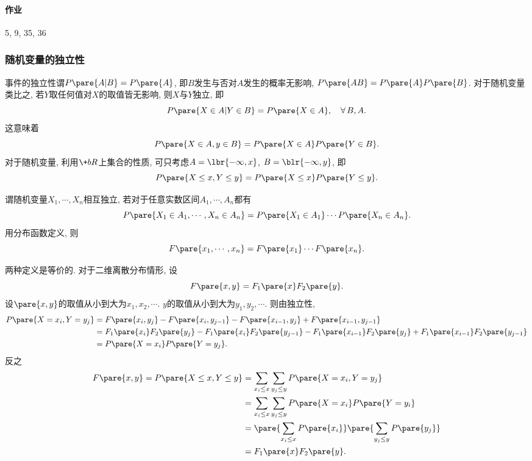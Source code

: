 \documentclass{ctexart}
\begin{document}

\paragraph{作业} %
\label{par:作业}

5, 9, 35, 36



\subsubsection{随机变量的独立性} %
\label{ssub:随机变量的独立性}

事件的独立性谓$P\pare{A\vert B} = P\pare{A}$, 即$B$发生与否对$A$发生的概率无影响, $P\pare{AB} = P\pare{A}P\pare{B}$. 对于随机变量类比之, 若$Y$取任何值对$X$的取值皆无影响, 则$X$与$Y$独立, 即
\[ P\pare{X\in A\vert Y\in B} = P\pare{X\in A},\quad \forall\, B,A. \]
这意味着
\[ P\pare{X\in A,y\in B} = P\pare{X\in A}P\pare{Y\in B}. \]
对于随机变量, 利用$\+bR$上集合的性质, 可只考虑$A = \lbr{-\infty,x}$, $B = \blr{-\infty,y}$, 即
\[ P\pare{X\le x, Y\le y} = P\pare{X\le x}P\pare{Y\le y}. \]
\begin{definition}[随机变量相互独立]
    谓随机变量$X_1,\cdots, X_n$相互独立, 若对于任意实数区间$A_1,\cdots, A_n$都有
    \[ P\pare{X_1 \in A_1,\cdots, X_n \in A_n} = P\pare{X_1\in A_1} \cdots P\pare{X_n \in A_n}. \]
    用分布函数定义, 则
    \[ F\pare{x_1,\cdots,x_n} = F\pare{x_1}\cdots F\pare{x_n}. \]
\end{definition}
两种定义是等价的. 对于二维离散分布情形, 设
\[ F\pare{x,y} = F_1\pare{x}F_2\pare{y}. \]
设$\pare{x,y}$的取值从小到大为$x_1,x_2,\cdots$. $y$的取值从小到大为$y_1,y_2,\cdots$. 则由独立性,
\begin{align*}
    P\pare{X=x_i,Y=y_j} &= F\pare{x_i,y_j} - F\pare{x_i,y_{j-1}} - F\pare{x_{i-1},y_j} + F\pare{x_{i-1},y_{j-1}} \\
    &= F_1\pare{x_i} F_2\pare{y_j} - F_1\pare{x_i}F_2\pare{y_{j-1}} - F_1\pare{x_{i-1}} F_2\pare{y_j} + F_1\pare{x_{i-1}}F_2\pare{y_{j-1}} \\
    &= P\pare{X=x_i}P\pare{Y=y_j}.
\end{align*}
反之
\begin{align*}
    F\pare{x,y} = P\pare{X\le x,Y\le y} &= \sum_{x_i \le x}\sum_{y_j\le y} P\pare{X=x_i,Y=y_j} \\
    &= \sum_{x_i\le x}\sum_{y_j\le y} P\pare{X=x_i}P\pare{Y=y_i} \\
    &= \pare{\sum_{x_i \le x}P\pare{x_i}} \pare{\sum_{y_j\le y}P\pare{y_j}} \\
    &= F_1\pare{x}F_2\pare{y}.
\end{align*}
\end{document}
